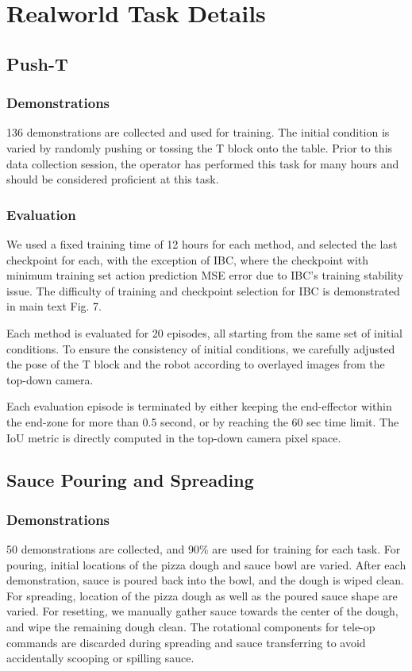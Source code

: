 \section{Realworld Task Details}

\subsection{Push-T}
\subsubsection{Demonstrations}
136 demonstrations are collected and used for training. The initial condition is varied by randomly pushing or tossing the T block onto the table. Prior to this data collection session, the operator has performed this task for many hours and should be considered proficient at this task.

\subsubsection{Evaluation}
We used a fixed training time of 12 hours for each method, and selected the last checkpoint for each, with the exception of IBC, where the checkpoint with minimum training set action prediction MSE error due to IBC's training stability issue. The difficulty of training and checkpoint selection for IBC is demonstrated in main text Fig. 7.

Each method is evaluated for 20 episodes, all starting from the same set of initial conditions. To ensure the consistency of initial conditions, we carefully adjusted the pose of the T block and the robot according to overlayed images from the top-down camera.

Each evaluation episode is terminated by either keeping the end-effector within the end-zone for more than 0.5 second, or by reaching the 60 sec time limit.
The IoU metric is directly computed in the top-down camera pixel space.

\subsection{Sauce Pouring and Spreading}
\subsubsection{Demonstrations} 
50 demonstrations are collected, and 90\% are used for training for each task. 
For pouring, initial locations of the pizza dough and sauce bowl are varied. After each demonstration, sauce is poured back into the bowl, and the dough is wiped clean.
For spreading, location of the pizza dough as well as the poured sauce shape are varied. For resetting, we manually gather sauce towards the center of the dough, and wipe the remaining dough clean. 
The rotational components for tele-op commands are discarded during  spreading and sauce transferring to avoid accidentally scooping or spilling sauce.

